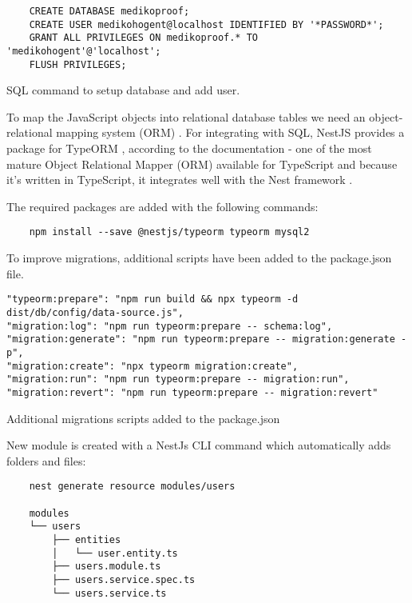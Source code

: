 \begin{listing}[H]
    \begin{verbatim}
    CREATE DATABASE medikoproof;
    CREATE USER medikohogent@localhost IDENTIFIED BY '*PASSWORD*';
    GRANT ALL PRIVILEGES ON medikoproof.* TO 'medikohogent'@'localhost';
    FLUSH PRIVILEGES;
    \end{verbatim}
\caption[SQL command to setup database and add user]{SQL command to setup database and add user.}
\end{listing}


To map the JavaScript objects into relational database tables we need an object-relational mapping system (ORM) \autocite{AmblerORM}. For integrating with SQL, NestJS provides a package for TypeORM \autocite{TypeORM}, according to the documentation - one of the most mature Object Relational Mapper (ORM) available for TypeScript and because it's written in TypeScript, it integrates well with the Nest framework \autocite{NestJsDoc}. 

The required packages are added with the following commands:

\begin{verbatim}
    npm install --save @nestjs/typeorm typeorm mysql2
\end{verbatim}

To improve migrations, additional scripts have been added to the package.json file.

\begin{listing}[H]
    \begin{verbatim}
"typeorm:prepare": "npm run build && npx typeorm -d dist/db/config/data-source.js",
"migration:log": "npm run typeorm:prepare -- schema:log",
"migration:generate": "npm run typeorm:prepare -- migration:generate -p",
"migration:create": "npx typeorm migration:create",
"migration:run": "npm run typeorm:prepare -- migration:run",
"migration:revert": "npm run typeorm:prepare -- migration:revert"
    \end{verbatim}
\caption[Migrations scripts]{Additional migrations scripts added to the package.json}
\end{listing}


New module is created with a NestJs CLI command which automatically adds folders and files:

\begin{verbatim}
    nest generate resource modules/users

    modules
    └── users
        ├── entities
        │   └── user.entity.ts
        ├── users.module.ts
        ├── users.service.spec.ts
        └── users.service.ts
\end{verbatim}


